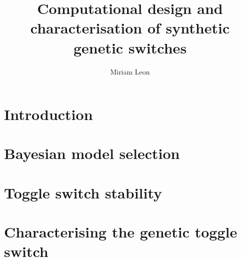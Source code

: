 \documentclass[]{phdthesis}
\title{Computational design and\\characterisation of synthetic\\ genetic switches}
\author{Miriam Leon}
\begin{document}
\maketitle


\begin{abstract}
\end{abstract}

\tableofcontents*
\listoffigures
\listoftables
{}

\printglossary[type=\acronymtype, title=Abbreviations, toctitle=Abbreviations]

\begin{acknowledgements}
\end{acknowledgements}


\mainmatter*
\chapter{Introduction}


\mainmatter*
\chapter{Bayesian model selection}



\mainmatter*
\chapter{Toggle switch stability}

%
%
%
%
%


\mainmatter*
\chapter{Characterising the genetic toggle switch}

\end{document}
